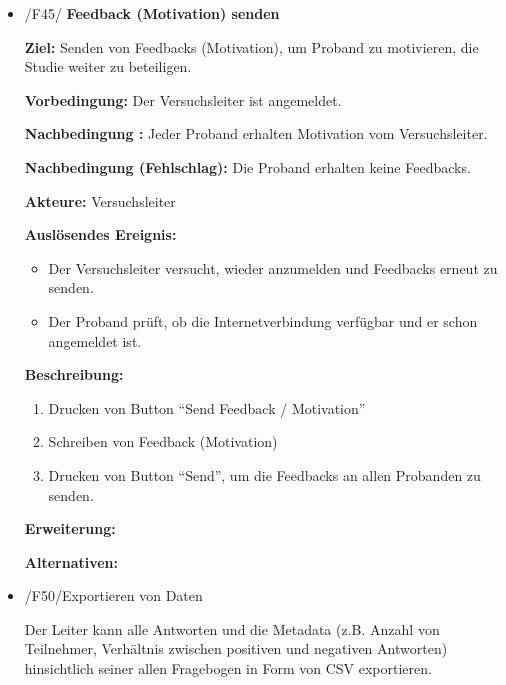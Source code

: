 \documentclass[a4paper]{scrreprt}
\begin{document}
\begin{itemize}
                \item /F45/ \textbf{Feedback (Motivation) senden}
                    \par \textbf{Ziel: }Senden von Feedbacks (Motivation), um Proband zu motivieren, die Studie weiter zu beteiligen.
                    \par \textbf{Vorbedingung: }Der Versuchsleiter ist angemeldet.
                    \par \textbf{Nachbedingung : }Jeder Proband erhalten Motivation vom Versuchsleiter.
                    \par \textbf{Nachbedingung (Fehlschlag): }Die Proband erhalten keine Feedbacks.
                    \par \textbf{Akteure: }Versuchsleiter
                    \par \textbf{Auslösendes Ereignis: }
                        \begin{itemize}
                            \item Der Versuchsleiter versucht, wieder anzumelden und Feedbacks erneut zu senden.
                            \item Der Proband pr\"uft, ob die Internetverbindung verf\"ugbar und er schon angemeldet ist.
                        \end{itemize}
                    \par \textbf{Beschreibung: }
                        \begin{enumerate}
                            \item Drucken von Button ``Send Feedback / Motivation''
                            \item Schreiben von Feedback (Motivation) 
                            \item Drucken von Button ``Send'', um die Feedbacks an allen Probanden zu senden.
                        \end{enumerate}
                    \par \textbf{Erweiterung: }
                    \par \textbf{Alternativen: }



	            \item /F50/Exportieren von Daten
		         	\par Der Leiter kann alle Antworten und die Metadata (z.B. Anzahl von Teilnehmer, Verhältnis zwischen positiven und negativen Antworten) hinsichtlich seiner allen Fragebogen in Form von CSV exportieren.

			\end{itemize}
    
\end{document}
